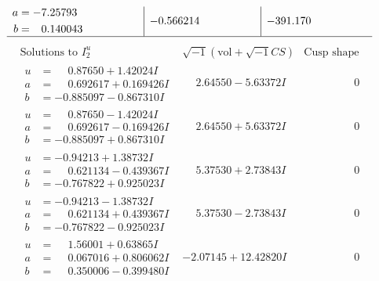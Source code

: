 \documentclass[1p]{elsarticle_modified}
\theoremstyle{definition}
\newcommand{\I}{\sqrt{-1}}
\begin{document}
$$\begin{array}{c|c|c}
\begin{aligned}
a &= -7.25793\phantom{ +0.000000I} \\
b &= \phantom{-}0.140043\phantom{ +0.000000I}\end{aligned}
 & -0.566214\phantom{ +0.000000I} & -391.170\phantom{ +0.000000I}\\
 \hline 
 \end{array}$$\newpage$$\begin{array}{c|c|c}  
\text{Solutions to }I^u_{2}& \I (\text{vol} + \sqrt{-1}CS) & \text{Cusp shape}\\
 \hline 
\begin{aligned}
u &= \phantom{-}0.87650 + 1.42024 I \\
a &= \phantom{-}0.692617 + 0.169426 I \\
b &= -0.885097 - 0.867310 I\end{aligned}
 & \phantom{-}2.64550 - 5.63372 I & \phantom{-0.000000 } 0 \\ \hline\begin{aligned}
u &= \phantom{-}0.87650 - 1.42024 I \\
a &= \phantom{-}0.692617 - 0.169426 I \\
b &= -0.885097 + 0.867310 I\end{aligned}
 & \phantom{-}2.64550 + 5.63372 I & \phantom{-0.000000 } 0 \\ \hline\begin{aligned}
u &= -0.94213 + 1.38732 I \\
a &= \phantom{-}0.621134 - 0.439367 I \\
b &= -0.767822 + 0.925023 I\end{aligned}
 & \phantom{-}5.37530 + 2.73843 I & \phantom{-0.000000 } 0 \\ \hline\begin{aligned}
u &= -0.94213 - 1.38732 I \\
a &= \phantom{-}0.621134 + 0.439367 I \\
b &= -0.767822 - 0.925023 I\end{aligned}
 & \phantom{-}5.37530 - 2.73843 I & \phantom{-0.000000 } 0 \\ \hline\begin{aligned}
u &= \phantom{-}1.56001 + 0.63865 I \\
a &= \phantom{-}0.067016 + 0.806062 I \\
b &= \phantom{-}0.350006 - 0.399480 I\end{aligned}
 & -2.07145 + 12.42820 I & \phantom{-0.000000 } 0 \\ \hline\begin{aligned}

\end{aligned}
\end{array}$$
\end{document}
